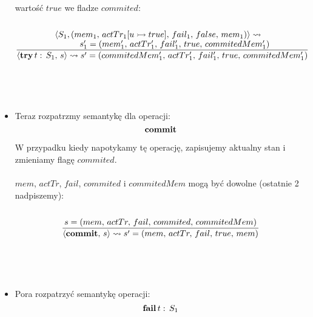 \documentclass{article}
\begin{document}
\begin{itemize}
      wartość $true$ we fladze $commited$:
      \\ \\
      \[
         \frac {
            \splitfrac {
               \langle S_1, (mem_1, \, actTr_1[u \rightarrowtail true], \, fail_1, \, false, \, mem_1) \rangle
               \leadsto
            } {
               s_1' = (mem_1', \, actTr_1', \, fail_1', \, true, \, commitedMem_1')
            }
         } {
            \langle {\bf try} \, t: \, S_1, \, s \rangle
            \leadsto s' = (commitedMem_1', \, actTr_1', \, fail_1', \, true, \, commitedMem_1')
         }
      \]
      \\ \\ \\

      \item
      Teraz rozpatrzmy semantykę dla operacji:
      \[
            {\bf commit}
      \]

      W przypadku kiedy napotykamy tę operację, zapisujemy aktualny stan i zmieniamy flagę $commited$.
      \\ \\
      $mem$, $actTr$, $fail$, $commited$ i $commitedMem$ mogą być dowolne (ostatnie 2 nadpiszemy):
      \\ \\
      \[
         \frac {
            s = (mem, \, actTr, \, fail, \, commited, \, commitedMem)
         } {
            \langle {\bf commit}, \, s \rangle
            \leadsto s' = (mem, \, actTr, \, fail, \, true, \, mem)
         }
      \]
      \\ \\ \\

      \item
      Pora rozpatrzyć semantykę operacji:
      \[
            {\bf fail} \, t: \, S_1
      \]


\end{itemize}
\end{document}

